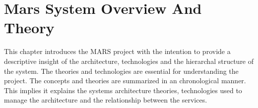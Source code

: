 \newpage
\chapter{Mars System Overview And Theory}

This chapter introduces the MARS project with the intention to provide a descriptive insight
of the architecture, technologies and the hierarchal structure of the system. The theories and
technologies are essential for understanding the project. The concepts and theories are summarized
in an chronological manner. This implies it explains the systems architecture theories,
technologies used to manage the architecture and the relationship between the services\cite{SOA}.

	
	